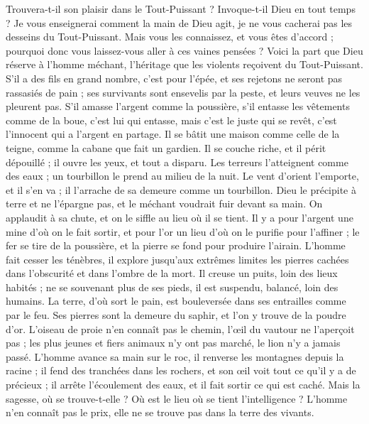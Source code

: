 \begin{multicols}{2}
Trouvera-t-il son plaisir dans le Tout-Puissant ? Invoque-t-il Dieu en tout temps ?
Je vous enseignerai comment la main de Dieu agit, je ne vous cacherai pas les desseins du Tout-Puissant.
Mais vous les connaissez, et vous êtes d'accord ; pourquoi donc vous laissez-vous aller à ces vaines pensées ?
Voici la part que Dieu réserve à l'homme méchant, l'héritage que les violents reçoivent du Tout-Puissant.
S'il a des fils en grand nombre, c'est pour l'épée, et ses rejetons ne seront pas rassasiés de pain ;
ses survivants sont ensevelis par la peste, et leurs veuves ne les pleurent pas.
S'il amasse l'argent comme la poussière, s'il entasse les vêtements comme de la boue,
c'est lui qui entasse, mais c'est le juste qui se revêt, c'est l'innocent qui a l'argent en partage.
Il se bâtit une maison comme celle de la teigne, comme la cabane que fait un gardien.
Il se couche riche, et il périt dépouillé ; il ouvre les yeux, et tout a disparu.
Les terreurs l'atteignent comme des eaux ; un tourbillon le prend au milieu de la nuit.
Le vent d'orient l'emporte, et il s'en va ; il l'arrache de sa demeure comme un tourbillon.
Dieu le précipite à terre et ne l'épargne pas, et le méchant voudrait fuir devant sa main.
On applaudit à sa chute, et on le siffle au lieu où il se tient.
\VerseOne{}Il y a pour l'argent une mine d'où on le fait sortir, et pour l'or un lieu d'où on le purifie pour l'affiner ;
le fer se tire de la poussière, et la pierre se fond pour produire l'airain.
L'homme fait cesser les ténèbres, il explore jusqu'aux extrêmes limites les pierres cachées dans l'obscurité et dans l'ombre de la mort.
Il creuse un puits, loin des lieux habités ; ne se souvenant plus de ses pieds, il est suspendu, balancé, loin des humains.
La terre, d'où sort le pain, est bouleversée dans ses entrailles comme par le feu.
Ses pierres sont la demeure du saphir, et l'on y trouve de la poudre d'or.
L'oiseau de proie n'en connaît pas le chemin, l'œil du vautour ne l'aperçoit pas ;
les plus jeunes et fiers animaux n'y ont pas marché, le lion n'y a jamais passé.
L'homme avance sa main sur le roc, il renverse les montagnes depuis la racine ;
il fend des tranchées dans les rochers, et son œil voit tout ce qu'il y a de précieux ;
il arrête l'écoulement des eaux, et il fait sortir ce qui est caché.
Mais la sagesse, où se trouve-t-elle ? Où est le lieu où se tient l'intelligence ?
L'homme n'en connaît pas le prix, elle ne se trouve pas dans la terre des vivants.

\end{multicols}
